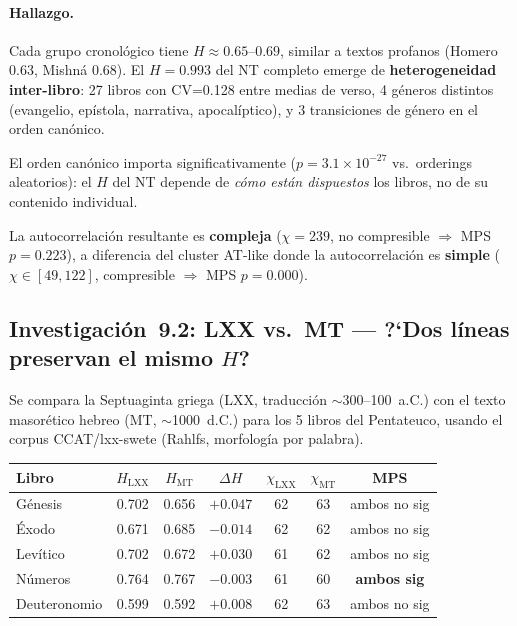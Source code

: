 \documentclass[12pt,a4paper]{article}
\begin{document}
\paragraph{Hallazgo.}
Cada grupo cronol\'ogico tiene $H \approx 0.65$--$0.69$, similar a textos profanos
(Homero 0.63, Mishn\'a 0.68). El $H = 0.993$ del NT completo emerge de
\textbf{heterogeneidad inter-libro}: 27 libros con CV=0.128 entre medias de verso,
4 g\'eneros distintos (evangelio, ep\'istola, narrativa, apocal\'iptico), y
3 transiciones de g\'enero en el orden can\'onico.

El orden can\'onico importa significativamente ($p = 3.1 \times 10^{-27}$ vs.\
orderings aleatorios): el $H$ del NT depende de \emph{c\'omo est\'an dispuestos}
los libros, no de su contenido individual.

La autocorrelaci\'on resultante es \textbf{compleja} ($\chi = 239$, no compresible
$\Rightarrow$ MPS $p = 0.223$), a diferencia del cluster AT-like donde la
autocorrelaci\'on es \textbf{simple} ($\chi \in [49, 122]$, compresible
$\Rightarrow$ MPS $p = 0.000$).


\subsection{Investigaci\'on~9.2: LXX vs.\ MT --- ?`Dos l\'ineas preservan el mismo $H$?}

Se compara la Septuaginta griega (LXX, traducci\'on $\sim$300--100~a.C.)
con el texto masor\'etico hebreo (MT, $\sim$1000~d.C.) para los 5 libros del
Pentateuco, usando el corpus CCAT/lxx-swete (Rahlfs, morfolog\'ia por palabra).

\begin{center}
\begin{tabular}{lcccccc}
\toprule
\textbf{Libro} & $H_{\text{LXX}}$ & $H_{\text{MT}}$ & $\Delta H$ & $\chi_{\text{LXX}}$ & $\chi_{\text{MT}}$ & \textbf{MPS} \\
\midrule
G\'enesis      & 0.702 & 0.656 & $+0.047$ & 62 & 63 & ambos no sig \\
\'Exodo        & 0.671 & 0.685 & $-0.014$ & 62 & 62 & ambos no sig \\
Lev\'itico     & 0.702 & 0.672 & $+0.030$ & 61 & 62 & ambos no sig \\
N\'umeros      & 0.764 & 0.767 & $-0.003$ & 61 & 60 & \textbf{ambos sig} \\
Deuteronomio   & 0.599 & 0.592 & $+0.008$ & 62 & 63 & ambos no sig \\
\bottomrule
\end{tabular}
\end{center}
\end{document}
